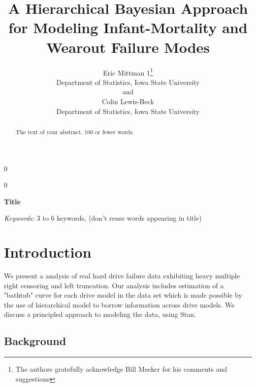 \documentclass[12pt]{article}
\newcommand{\blind}{0}
\begin{document}
%

\def\spacingset#1{\renewcommand{\baselinestretch}%
{#1}\small\normalsize} \spacingset{1}



\blind
{
  \title{\bf A Hierarchical Bayesian Approach for Modeling Infant-Mortality and Wearout Failure Modes}
  \author{Eric Mittman 1\thanks{
    The authors gratefully acknowledge Bill Meeker for his comments and suggestions}\hspace{.2cm}\\
    Department of Statistics, Iowa State University\\
    and \\
    Colin Lewis-Beck \\
    Department of Statistics, Iowa State University}
  \maketitle
} \fi

\blind
{
  \bigskip
  \bigskip
  \bigskip
  \begin{center}
    {\LARGE\bf Title}
\end{center}
  \medskip
} \fi

\bigskip
\begin{abstract}
The text of your abstract.  100 or fewer words.
\end{abstract}

\noindent%
{\it Keywords:}  3 to 6 keywords, (don't reuse words appearing in title)
\vfill

\newpage
\spacingset{1.45} %
\section{Introduction}
We present a analysis of real hard drive failure data exhibiting heavy multiple right censoring and left truncation. Our analysis includes estimation of a "bathtub" curve for each drive model in the data set which is made possible by the use of hierarchical model to borrow information across drive models. We discuss a principled approach to modeling the data, using Stan.

\subsection{Background}
\end{document}
